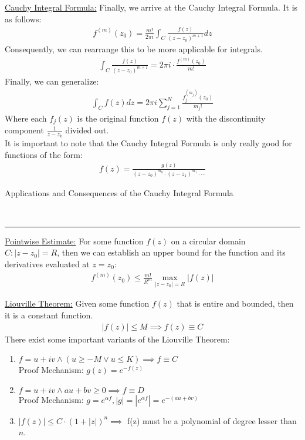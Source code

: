 \documentclass{article}
\newcommand{\header}[1]{\begin{large}\noindent #1\end{large}\\\rule{\textwidth}{0.5pt}}
\newcommand{\gap}{\medskip\\}
\newcommand{\sheader}[1]{\underline{#1:}}
\begin{document}
    \sheader{Cauchy Integral Formula} Finally, we arrive at the Cauchy Integral Formula.
    It is as follows:
    \begin{align*}
        f^{(m)}(z_0) = \frac{m!}{2\pi i} \int_C\frac{f(z)}{(z-z_0)^{m+1}}dz
    \end{align*}
    Consequently, we can rearrange this to be more applicable for integrals.
    \begin{align*}
        \int_C \frac{f(z)}{(z-z_0)^{m + 1}} = 2\pi i  \cdot \frac{f^{(m)}(z_0)}{m!}
    \end{align*}
    Finally, we can generalize:
    \begin{align*}
        \int_C f(z)dz = 2\pi i \sum_{j = 1}^N \frac{f^{(m_j)}_j(z_0)}{m_j!}
    \end{align*}
    Where each $f_j(z)$ is the original function $f(z)$ with the discontinuity component 
    $\frac{1}{z-z_k}$ divided out.
    \gap
    It is important to note that the Cauchy Integral Formula is only really good for 
    functions of the form:
    \begin{align*}
        f(z) = \frac{g(z)}{(z-z_0)^{m_0} \cdot (z-z_1)^{m_1} \cdot \cdots}
    \end{align*}

    \header{Applications and Consequences of the Cauchy Integral Formula}

    \sheader{Pointwise Estimate} For some function $f(z)$ on a circular domain $C: |z - z_0| = R$, then we can 
    establish an upper bound for the function and its derivatives evaluated at $z = z_0$:
    \begin{align*}
        f^{(m)}(z_0) \leq \frac{m!}{R^m}\max_{|z-z_0| = R}|f(z)|
    \end{align*}

    \sheader{Liouville Theorem} Given some function $f(z)$ that is entire and bounded, then 
    it is a constant function.
    \begin{align*}
        |f(z)| \leq M \implies f(z)\equiv C
    \end{align*}
    There exist some important variants of the Liouville Theorem:
    \begin{enumerate}
        \item $f = u + iv \wedge (u \geq -M \vee u \leq K) \implies f \equiv C$ \\
        Proof Mechanism: $g(z) = e^{-f(z)}$
        \item $f = u + iv \wedge au + bv \geq 0 \implies f \equiv D$\\
        Proof Mechanism: $g = e^{\alpha f}, |g| = |e^{\alpha f}| = e^{-(au + bv)}$
        \item $|f(z)| \leq C\cdot (1 + |z|)^n \implies $ f(z) must be a polynomial of degree lesser than $n$.
    \end{enumerate}
\end{document}
